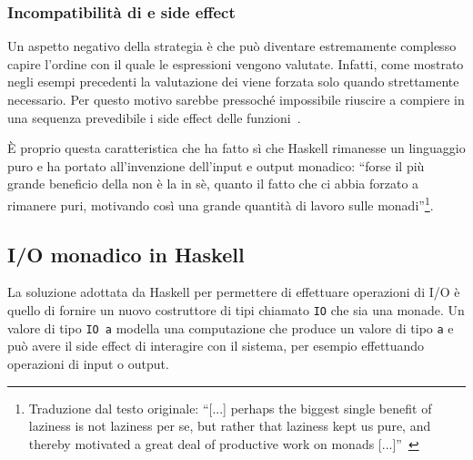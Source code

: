 \subsubsection{Incompatibilità di  e side effect}
Un aspetto negativo della strategia  è che può diventare estremamente complesso capire l'ordine con il quale le espressioni vengono valutate. Infatti, come mostrato negli esempi precedenti la valutazione dei  viene forzata solo quando strettamente necessario. Per questo motivo sarebbe pressoché impossibile riuscire a compiere in una sequenza prevedibile i side effect delle funzioni~\cite{cit:tackling-the-awkward-squad}.

È proprio questa caratteristica che ha fatto sì che Haskell rimanesse un linguaggio puro e ha portato all'invenzione dell'input e output monadico: ``forse il più grande beneficio della  non è la  in sè, quanto il fatto che ci abbia forzato a rimanere puri, motivando così una grande quantità di lavoro sulle monadi''\footnote{Traduzione dal testo originale: ``[...] perhaps the biggest single benefit of laziness is not laziness per se, but rather that laziness kept us pure, and thereby motivated a great deal of productive work on monads [...]''~\cite{cit:a-history-of-haskell-being-lazy-with-class}}.

\subsection{I/O monadico in Haskell}
\label{sub:io-monadico-haskell}
La soluzione adottata da Haskell per permettere di effettuare operazioni di I/O è quello di fornire un nuovo costruttore di tipi chiamato \lstinline{IO} che sia una monade. Un valore di tipo \lstinline{IO a} modella una computazione che produce un valore di tipo \lstinline{a} e può avere il side effect di interagire con il sistema, per esempio effettuando operazioni di input o output.

